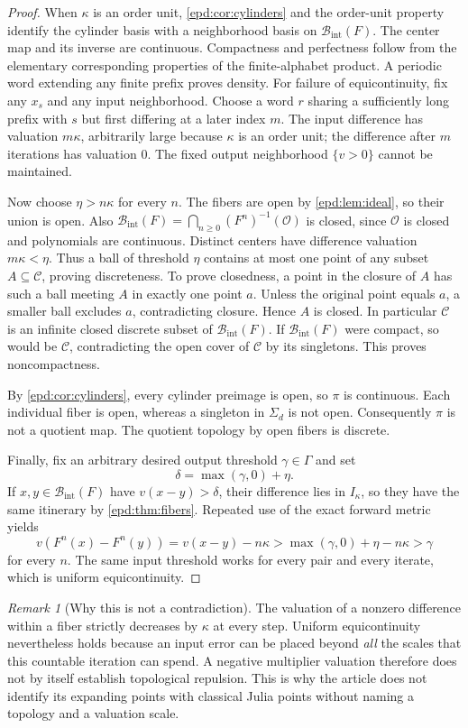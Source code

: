 \documentclass[11pt,a4paper]{article}
\numberwithin{equation}{section}
\theoremstyle{plain}
\theoremstyle{definition}
\theoremstyle{remark}
\newtheorem{remark}[remark]{Remark}
\newcommand{\OO}{\mathcal O}
\newcommand{\Ik}{I_\kappa}
\newcommand{\BI}{\mathcal B_{\mathrm{int}}}
\newcommand{\CS}{\mathcal C}
\newcommand{\Sig}{\Sigma_d}
\begin{document}
\begin{proof}
When $\kappa$ is an order unit, \cref{epd:cor:cylinders} and the order-unit property identify
the cylinder basis with a neighborhood basis on $\BI(F)$. The center
map and its inverse are continuous. Compactness and perfectness follow
from the elementary corresponding properties of the finite-alphabet
product. A periodic word extending any finite prefix proves density.
For failure of equicontinuity, fix any $x_s$ and any input neighborhood.
Choose a word $r$ sharing a sufficiently long prefix with $s$ but first
differing at a later index $m$. The input difference has valuation
$m\kappa$, arbitrarily large because $\kappa$ is an order unit; the difference after $m$
iterations has valuation $0$. The fixed output neighborhood $\{v>0\}$
cannot be maintained.

Now choose $\eta>n\kappa$ for every $n$. The fibers are open by
\cref{epd:lem:ideal}, so their union is open. Also
$\BI(F)=\bigcap_{n\geq0}(F^n)^{-1}(\OO)$ is closed, since $\OO$ is
closed and polynomials are continuous. Distinct centers have difference
valuation $m\kappa<\eta$. Thus a ball of threshold $\eta$ contains
at most one point of any subset $A\subseteq\CS$, proving discreteness.
To prove closedness, a point in the closure of $A$ has such a ball
meeting $A$ in exactly one point $a$. Unless the original point equals
$a$, a smaller ball excludes $a$, contradicting closure. Hence $A$ is
closed. In particular $\CS$ is an infinite closed discrete subset of
$\BI(F)$. If $\BI(F)$ were compact, so would be $\CS$, contradicting
the open cover of $\CS$ by its singletons. This proves noncompactness.

By \cref{epd:cor:cylinders}, every cylinder preimage is open, so $\pi$ is
continuous. Each individual fiber is open, whereas a singleton in
$\Sig$ is not open. Consequently $\pi$ is not a quotient map. The
quotient topology by open fibers is discrete.

Finally, fix an arbitrary desired output threshold $\gamma\in\Gamma$
and set
\[
 \delta=\max(\gamma,0)+\eta.
\]
If $x,y\in\BI(F)$ have $v(x-y)>\delta$, their difference lies in
$\Ik$, so they have the same itinerary by \cref{epd:thm:fibers}. Repeated
use of the exact forward metric yields
\[
 v(F^n(x)-F^n(y))=v(x-y)-n\kappa
 >\max(\gamma,0)+\eta-n\kappa>\gamma
\]
for every $n$. The same input threshold works for every pair and every
iterate, which is uniform equicontinuity.
\end{proof}

\begin{remark}[Why this is not a contradiction]\label{epd:rem:expansion}
The valuation of a nonzero difference within a fiber strictly decreases
by $\kappa$ at every step. Uniform equicontinuity nevertheless holds
because an input error can be placed beyond \emph{all} the scales that
this countable iteration can spend. A negative multiplier valuation
therefore does not by itself establish topological repulsion. This is
why the article does not identify its expanding points with classical
Julia points without naming a topology and a valuation scale.
\end{remark}
\end{document}
